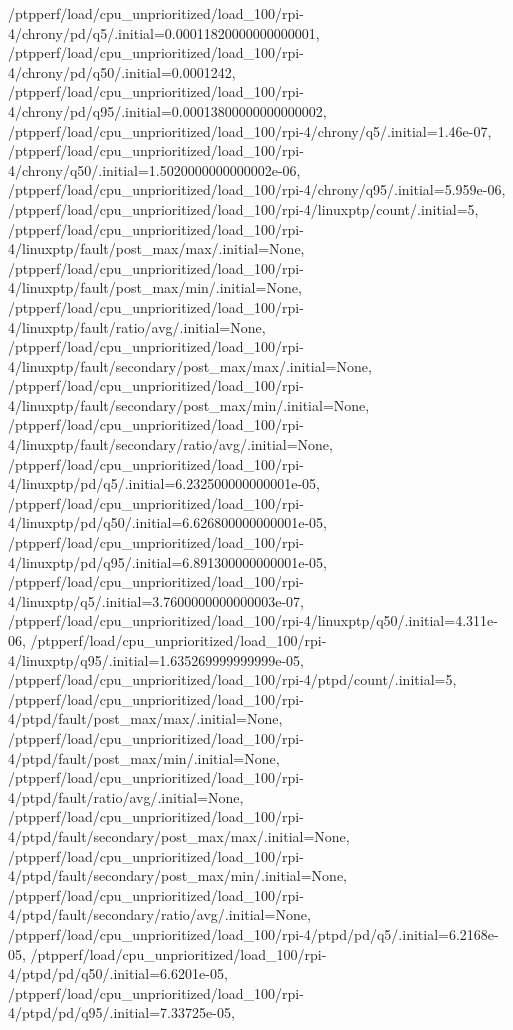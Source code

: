 {    /ptpperf/load/cpu_unprioritized/load_100/rpi-4/chrony/pd/q5/.initial=0.00011820000000000001,
    /ptpperf/load/cpu_unprioritized/load_100/rpi-4/chrony/pd/q50/.initial=0.0001242,
    /ptpperf/load/cpu_unprioritized/load_100/rpi-4/chrony/pd/q95/.initial=0.00013800000000000002,
    /ptpperf/load/cpu_unprioritized/load_100/rpi-4/chrony/q5/.initial=1.46e-07,
    /ptpperf/load/cpu_unprioritized/load_100/rpi-4/chrony/q50/.initial=1.5020000000000002e-06,
    /ptpperf/load/cpu_unprioritized/load_100/rpi-4/chrony/q95/.initial=5.959e-06,
    /ptpperf/load/cpu_unprioritized/load_100/rpi-4/linuxptp/count/.initial=5,
    /ptpperf/load/cpu_unprioritized/load_100/rpi-4/linuxptp/fault/post_max/max/.initial=None,
    /ptpperf/load/cpu_unprioritized/load_100/rpi-4/linuxptp/fault/post_max/min/.initial=None,
    /ptpperf/load/cpu_unprioritized/load_100/rpi-4/linuxptp/fault/ratio/avg/.initial=None,
    /ptpperf/load/cpu_unprioritized/load_100/rpi-4/linuxptp/fault/secondary/post_max/max/.initial=None,
    /ptpperf/load/cpu_unprioritized/load_100/rpi-4/linuxptp/fault/secondary/post_max/min/.initial=None,
    /ptpperf/load/cpu_unprioritized/load_100/rpi-4/linuxptp/fault/secondary/ratio/avg/.initial=None,
    /ptpperf/load/cpu_unprioritized/load_100/rpi-4/linuxptp/pd/q5/.initial=6.232500000000001e-05,
    /ptpperf/load/cpu_unprioritized/load_100/rpi-4/linuxptp/pd/q50/.initial=6.626800000000001e-05,
    /ptpperf/load/cpu_unprioritized/load_100/rpi-4/linuxptp/pd/q95/.initial=6.891300000000001e-05,
    /ptpperf/load/cpu_unprioritized/load_100/rpi-4/linuxptp/q5/.initial=3.7600000000000003e-07,
    /ptpperf/load/cpu_unprioritized/load_100/rpi-4/linuxptp/q50/.initial=4.311e-06,
    /ptpperf/load/cpu_unprioritized/load_100/rpi-4/linuxptp/q95/.initial=1.635269999999999e-05,
    /ptpperf/load/cpu_unprioritized/load_100/rpi-4/ptpd/count/.initial=5,
    /ptpperf/load/cpu_unprioritized/load_100/rpi-4/ptpd/fault/post_max/max/.initial=None,
    /ptpperf/load/cpu_unprioritized/load_100/rpi-4/ptpd/fault/post_max/min/.initial=None,
    /ptpperf/load/cpu_unprioritized/load_100/rpi-4/ptpd/fault/ratio/avg/.initial=None,
    /ptpperf/load/cpu_unprioritized/load_100/rpi-4/ptpd/fault/secondary/post_max/max/.initial=None,
    /ptpperf/load/cpu_unprioritized/load_100/rpi-4/ptpd/fault/secondary/post_max/min/.initial=None,
    /ptpperf/load/cpu_unprioritized/load_100/rpi-4/ptpd/fault/secondary/ratio/avg/.initial=None,
    /ptpperf/load/cpu_unprioritized/load_100/rpi-4/ptpd/pd/q5/.initial=6.2168e-05,
    /ptpperf/load/cpu_unprioritized/load_100/rpi-4/ptpd/pd/q50/.initial=6.6201e-05,
    /ptpperf/load/cpu_unprioritized/load_100/rpi-4/ptpd/pd/q95/.initial=7.33725e-05,
}
